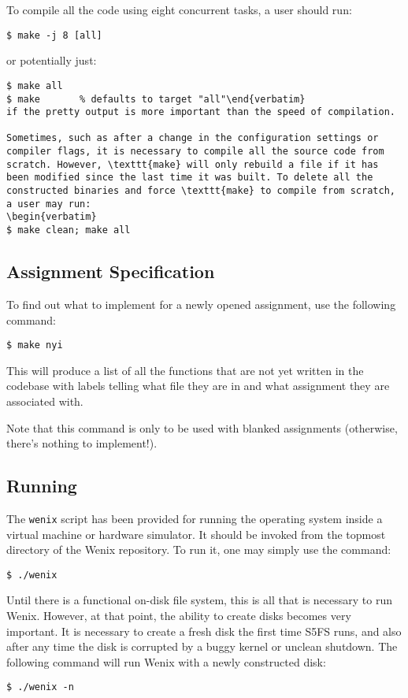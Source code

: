 To compile all the code using eight concurrent tasks, a user should run:
\begin{verbatim}
$ make -j 8 [all]\end{verbatim}
or potentially just:
\begin{verbatim}
$ make all
$ make       % defaults to target "all"\end{verbatim}
if the pretty output is more important than the speed of compilation.

Sometimes, such as after a change in the configuration settings or compiler flags, it is necessary to compile all the source code from scratch. However, \texttt{make} will only rebuild a file if it has been modified since the last time it was built. To delete all the constructed binaries and force \texttt{make} to compile from scratch, a user may run:
\begin{verbatim}
$ make clean; make all\end{verbatim}

\subsection{Assignment Specification}
To find out what to implement for a newly opened assignment, use the following command:
\begin{verbatim}
$ make nyi\end{verbatim}
This will produce a list of all the functions that are not yet written in the codebase with labels telling what file they are in and what assignment they are associated with.

Note that this command is only to be used with blanked assignments (otherwise, there's nothing to implement!).

\subsection{Running}
The \texttt{wenix} script has been provided for running the operating system inside a virtual machine or hardware simulator. It should be invoked from the topmost directory of the Wenix repository. To run it, one may simply use the command:
\begin{verbatim}
$ ./wenix\end{verbatim}

Until there is a functional on-disk file system, this is all that is necessary to run Wenix. However, at that point, the ability to create disks becomes very important. It is necessary to create a fresh disk the first time S5FS runs, and also after any time the disk is corrupted by a buggy kernel or unclean shutdown. The following command will run Wenix with a newly constructed disk:
\begin{verbatim}
$ ./wenix -n\end{verbatim}

